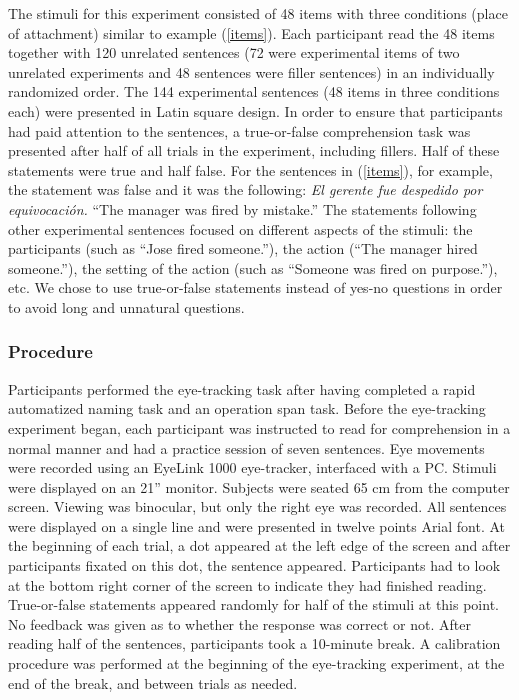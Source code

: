 \documentclass{frontiersSCNS}\usepackage{knitr}
\begin{document}
The stimuli for this experiment consisted of 48 items with three conditions (place of attachment)  similar to example (\ref{items}). 
Each participant read the 48 items together with 120 unrelated sentences (72 were experimental items of two unrelated experiments and 48 sentences were filler sentences)  in an individually randomized order. The 144 experimental sentences (48 items in three conditions each) were presented in Latin square design. In order to ensure that participants had paid attention to the sentences, a true-or-false  comprehension task was presented after half of all trials in the experiment, including fillers. Half of these statements were true and half false. For the sentences in (\ref{items}), for example, the statement was false and it was the following: \emph{El gerente fue despedido por equivocación.} ``The manager was fired by mistake.'' The statements following other experimental sentences focused on different aspects of the stimuli: the participants (such as ``Jose fired someone.''), the action (``The manager hired someone.''), the setting of the action (such as ``Someone was fired on purpose.''), etc. We chose to use  true-or-false statements instead of yes-no questions in order to avoid long and unnatural questions.




\subsubsection{Procedure}
Participants performed the eye-tracking task after having completed  a rapid automatized naming task and  an operation span task. Before the eye-tracking experiment  began, each participant was instructed to read for comprehension in a normal manner and had a practice session of seven sentences.  Eye movements were recorded using an EyeLink 1000 eye-tracker, interfaced with a PC. Stimuli were displayed on an 21'' monitor. Subjects were seated 65 cm from the computer screen. Viewing was binocular, but only the right eye was recorded. All sentences were displayed on a single line and were presented in twelve points Arial font. At the beginning of each trial, a dot appeared at the left edge of the screen and after participants fixated on this dot, the sentence appeared. Participants had to look at the bottom right corner of the screen to indicate they had finished reading. True-or-false statements appeared randomly for half of the stimuli at this point.  No feedback was given as to whether the response was correct or not. After reading half of the sentences, participants took a 10-minute break.
A calibration procedure was performed at the beginning of the eye-tracking experiment, at the end of the  break,  and between trials as needed.
\end{document}

